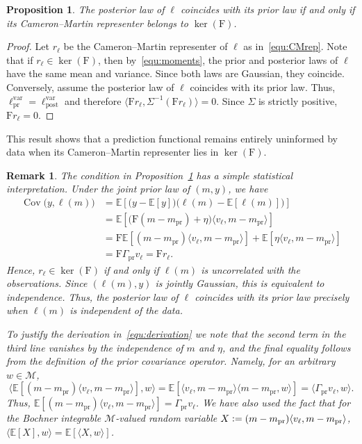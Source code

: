 \documentclass[ba]{imsart}
\theoremstyle{plain}
\newtheorem{proposition}[theorem]{Proposition}
\newtheorem{remark}[theorem]{Remark}
\newcommand{\defeq}{\vcentcolon=}
\newcommand{\prcov}{\Gamma_{\mathrm{pr}}}
\newcommand{\F}{\mathrm{F}}
\newcommand{\dpar}{{m}}
\newcommand{\dparpr}{\dpar_{\mathrm{pr}}}
\newcommand{\ip}[2]{\langle {#1}, {#2}\rangle}
\newcommand{\lprsig}{\ell_\text{pr}^\text{var}}
\newcommand{\lpostsig}{\ell_\text{post}^\text{var}}
\newcommand{\Gammay}{\Sigma}
\newcommand{\M}{\mathcal{M}}
\DeclareMathOperator{\Cov}{Cov}
\begin{document}
\begin{proposition}\label{prp:unlearnable}
The posterior law of $\ell$ coincides with its prior law if and only if
its Cameron--Martin representer belongs to $\ker(\F)$.
\end{proposition}
\begin{proof}
Let $r_\ell$ be the Cameron--Martin representer of $\ell$ as in~\eqref{equ:CMrep}.
Note that if $r_\ell\in\ker(\F)$, then 
by~\eqref{equ:moments}, the prior and posterior laws of $\ell$ have the same
mean and variance. Since both laws are Gaussian, they coincide.
Conversely, assume the posterior law of $\ell$ coincides with its prior
law. Thus, $\lprsig = \lpostsig$ and therefore 
$\ip{\F r_\ell}{\Gammay^{-1}(\F r_\ell)} = 0$.
Since $\Gammay$ is strictly positive, 
$\F r_\ell=0$.
\end{proof}
This result shows that a prediction functional remains entirely uninformed by data
when its Cameron--Martin representer lies in $\ker(\F)$. 
\begin{remark}
The condition in Proposition~\ref{prp:unlearnable} has a simple statistical
interpretation. Under the joint prior law of $(m,y)$, we have
\begin{equation}\label{equ:derivation}
\begin{aligned}
\Cov\bigl(y,\ell(m)\bigr)
&=
\mathbb{E}\!\left[
\bigl(y-\mathbb{E}[y]\bigr)
\bigl(\ell(m)-\mathbb{E}[\ell(m)]\bigr)
\right] \\
&=
\mathbb{E}\!\left[
\bigl(\F(m-\dparpr)+\eta\bigr)
\ip{v_\ell}{m-\dparpr}
\right] \\
&=
\F\mathbb{E}\!\left[
(m-\dparpr)\ip{v_\ell}{m-\dparpr}
\right]
+
\mathbb{E}\!\left[
\eta\ip{v_\ell}{m-\dparpr}
\right] \\
&=
\F\prcov v_\ell
=
\F r_\ell.
\end{aligned}
\end{equation}
Hence, $r_\ell\in\ker(\F)$ if and only if $\ell(m)$ is uncorrelated with the
observations. Since $(\ell(m),y)$ is jointly Gaussian, this is equivalent to
independence.  Thus, the posterior law of $\ell$ coincides with its prior law
precisely when $\ell(m)$ is independent of the data.

To justify the derivation in~\eqref{equ:derivation}
we note that the second term in the third line vanishes by the independence of $m$
and $\eta$, and the final equality follows from the definition of the prior
covariance operator. Namely,
for an arbitrary $w\in\M$, 
\[
\ip{
\mathbb{E}\!\left[
(m-\dparpr)\ip{v_\ell}{m-\dparpr}
\right]
}{w}
=
\mathbb{E}\!\left[
\ip{v_\ell}{m-\dparpr}
\ip{m-\dparpr}{w}
\right] 
=
\ip{\prcov v_\ell}{w}.
\]
Thus,
$\mathbb{E}[(m-\dparpr)\ip{v_\ell}{m-\dparpr}]
=
\prcov v_\ell$.
We have also used the fact that 
for the Bochner integrable $\M$-valued random variable 
$X \defeq (m-\dparpr)\ip{v_\ell}{m-\dparpr}$,
$\ip{\mathbb{E}[X]}{w} = \mathbb{E}\!\left[\ip{X}{w}\right]$.
\end{remark}
\end{document}
